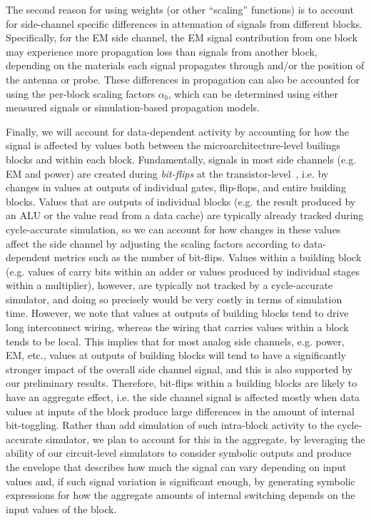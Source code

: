 The second reason for using weights (or other ``scaling'' functions) is to account for side-channel specific differences in attenuation of signals from different blocks. Specifically, for the EM side channel, the EM signal contribution from one block may experience more propagation loss than signals from another block, depending on the materials each signal propagates through and/or the position of the antenna or probe. These differences in propagation can also be accounted for using the per-block scaling factors $\alpha_b$, which can be determined using either measured signals or simulation-based propagation models.

Finally, we will account for data-dependent activity by accounting for how the signal is affected by values both between the microarchitecture-level builings blocks and within each block. Fundamentally, signals in most side channels (e.g. EM and power) are created during  \textit{bit-flips} at the transistor-level~\cite{VANECK1985269,6766222}, i.e. by changes in values at outputs of individual gates, flip-flops, and entire building blocks. Values that are outputs of individual blocks (e.g. the result produced by an ALU or the value read from a data cache) are typically already tracked during cycle-accurate simulation, so we can account for how changes in these values affect the side channel by adjusting the scaling factors according to data-dependent metrics such as the number of bit-flips. Values within a building block (e.g. values of carry bits within an adder or values produced by individual stages within a multiplier), however, are typically not tracked by a cycle-accurate simulator, and doing so precisely would be very costly in terms of simulation time. However, we note that values at outputs of building blocks tend to drive long interconnect wiring, whereas the wiring that carries values within a block tends to be local. This implies that for most analog side channels, e.g. power, EM, etc., values at outputs of building blocks will tend to have a significantly stronger impact of the overall side channel signal, and this is also supported by our preliminary results. Therefore, bit-flips within a building blocks are likely to have an aggregate effect, i.e. the side channel signal is affected mostly when data values at inputs of the block produce large differences in the amount of internal bit-toggling. Rather than add simulation of such intra-block activity to the cycle-accurate simulator, we plan to account for this in the aggregate, by leveraging the ability of our circuit-level simulators to consider symbolic outputs and produce the envelope that describes how much the signal can vary depending on input values and, if such signal variation is significant enough, by generating symbolic expressions for how the aggregate amounts of internal switching depends on the input values of the block.

